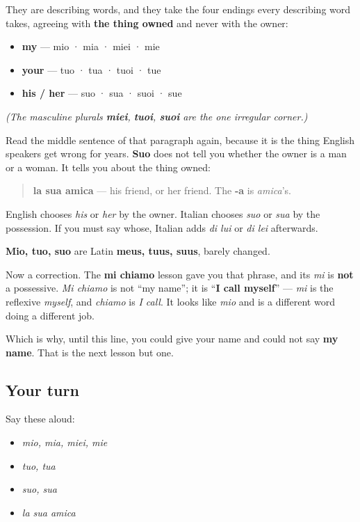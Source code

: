 They are describing words, and they take the four endings every describing word takes, agreeing with \textbf{the thing owned} and never with the owner:

\begin{itemize}
\raggedright
  \item \textbf{my} — mio · mia · miei · mie
  \item \textbf{your} — tuo · tua · tuoi · tue
  \item \textbf{his / her} — suo · sua · suoi · sue
\end{itemize}

\emph{(The masculine plurals \textbf{miei}, \textbf{tuoi}, \textbf{suoi} are the one irregular corner.)}

Read the middle sentence of that paragraph again, because it is the thing English speakers get wrong for years. \textbf{Suo} does not tell you whether the owner is a man or a woman. It tells you about the thing owned:

\begin{quote}
\textbf{la sua amica} — his friend, or her friend. The \textbf{-a} is \emph{amica}'s.
\end{quote}

English chooses \emph{his} or \emph{her} by the owner. Italian chooses \emph{suo} or \emph{sua} by the possession. If you must say whose, Italian adds \emph{di lui} or \emph{di lei} afterwards.

\begin{cousinweb}
\textbf{Mio, tuo, suo} are Latin \textbf{meus, tuus, suus}, barely changed.

Now a correction. The \textbf{mi chiamo} lesson gave you that phrase, and its \emph{mi} is \textbf{not} a possessive. \emph{Mi chiamo} is not \textquotedblleft{}my name\textquotedblright{}; it is \textquotedblleft{}\textbf{I call myself}\textquotedblright{} — \emph{mi} is the reflexive \emph{myself}, and \emph{chiamo} is \emph{I call}. It looks like \emph{mio} and is a different word doing a different job.

Which is why, until this line, you could give your name and could not say \textbf{my name}. That is the next lesson but one.
\end{cousinweb}

\subsection*{Your turn}
Say these aloud:

\begin{itemize}
\raggedright
  \item \emph{mio, mia, miei, mie}
  \item \emph{tuo, tua}
  \item \emph{suo, sua}
  \item \emph{la sua amica}
\end{itemize}

